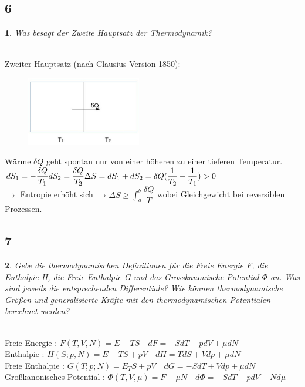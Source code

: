 \documentclass[12pt,a4paper]{report}
\newtheorem{myfrag}{}%
\begin{document}
\subsection{6}
\begin{myfrag}
Was besagt der Zweite Hauptsatz der Thermodynamik?
\end{myfrag} \quad \\
Zweiter Hauptsatz (nach Clausius Version 1850): \\[2ex]
\begin{figure}
\includegraphics[width=5cm]{Bilder/Frage6.jpg} 
\end{figure}
Wärme $\delta Q$ geht spontan nur von einer höheren zu einer tieferen Temperatur. \\
$dS_1 = - \dfrac{\delta Q}{T_1} \\
dS_2 = \dfrac{\delta Q}{T_2} \\
\Delta S = dS_1 + dS_2 = \delta Q ( \dfrac{1}{T_2} -\dfrac{1}{T_1}) > 0$ \\
$\rightarrow $ Entropie erhöht sich $\rightarrow  \Delta S \geq \int_a^b \dfrac{\delta Q}{T} $ wobei Gleichgewicht bei reversiblen Prozessen.
\subsection{7}
\begin{myfrag}
Gebe die thermodynamischen Definitionen für die Freie Energie F, die
Enthalpie H, die Freie Enthalpie G und das Grosskanonische Potential $\Phi $
an. Was sind jeweils die entsprechenden Differentiale? Wie können
thermodynamische Größen und generalisierte Kräfte mit den
thermodynamischen Potentialen berechnet werden?
\end{myfrag} \quad \\
Freie Energie : $F(T,V,N) = E-TS \quad dF = -SdT -pdV+\mu dN$ \\
Enthalpie : $ H(S;p,N)=E-TS+pV \quad dH = TdS +Vdp+\mu dN$ \\
Freie Enthalpie : $ G(T;p;N)=E_TS+pV \quad dG=-SdT+Vdp+\mu dN$ \\
Großkanonisches Potential : $\Phi(T,V,\mu ) = F-\mu N \quad d \Phi = -SdT-pdV-Nd \mu $ \\[2ex]
\end{document}
